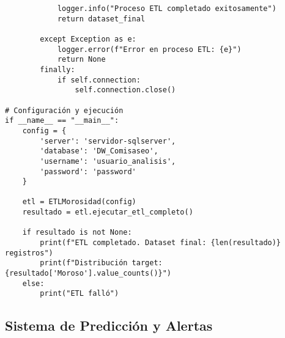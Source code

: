 \begin{verbatim}
            logger.info("Proceso ETL completado exitosamente")
            return dataset_final
            
        except Exception as e:
            logger.error(f"Error en proceso ETL: {e}")
            return None
        finally:
            if self.connection:
                self.connection.close()

# Configuración y ejecución
if __name__ == "__main__":
    config = {
        'server': 'servidor-sqlserver',
        'database': 'DW_Comisaseo', 
        'username': 'usuario_analisis',
        'password': 'password'
    }
    
    etl = ETLMorosidad(config)
    resultado = etl.ejecutar_etl_completo()
    
    if resultado is not None:
        print(f"ETL completado. Dataset final: {len(resultado)} registros")
        print(f"Distribución target: {resultado['Moroso'].value_counts()}")
    else:
        print("ETL falló")
\end{verbatim}
\subsection{Sistema de Predicción y Alertas}

